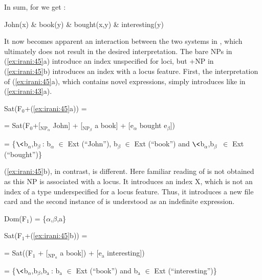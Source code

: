 \documentclass[output=paper,
modfonts
]{langscibook}
\begin{document}
In sum, for  we get :

\begin{exe}

\ex\label{ex:irani:62} John(x) \& book(y) \& bought(x,y) \& interesting(y)

\end{exe}

It now becomes apparent an interaction between the two systems in , which ultimately does not result in the desired interpretation. The bare NPs in (\ref{ex:irani:45}a) introduce an index unspecified for loci, but +NP in (\ref{ex:irani:45}b) introduces an index with a locus feature. First, the interpretation of (\ref{ex:irani:45}a), which contains novel expressions, simply introduces  like in (\ref{ex:irani:43}a). 

\begin{exe}

\ex Sat(F$_0$+(\ref{ex:irani:45}a)) = \par 
= Sat(F$_0$+[$_{\text{NP}_{\alpha}}$ John] + [$_{\text{NP}_\beta}$ a book] + [e$_{\alpha}$ bought e$_{\beta}$])\par 
= \{$\<$b$_{\alpha}$,b$_{\beta}\>$: b$_{\alpha}$ \(\in\) Ext (``John''), b$_{\beta}$ \(\in\) Ext (``book'') and $\<$b$_{\alpha}$,b$_{\beta}\>$ \(\in\) Ext \\ (``bought'')\}  

\end{exe}

(\ref{ex:irani:45}b), in contrast, is different. Here familiar reading of  is not obtained as this NP is associated with a locus. It introduces an index X, which is not an index of a type underspecified for a locus feature. Thus, it introduces a new file card and the second instance of  is understood as an indefinite expression. 

\begin{exe}

\ex Dom(F$_1$) = \{\(\alpha\),\(\beta\),a\}\par 

Sat(F$_1$+(\ref{ex:irani:45}b)) = \par 
= Sat((F$_1$ + [$_{\text{NP}_{a}}$ a book]) + [e$_\text{a}$ interesting]) \par 
= \{$\<$b$_{\alpha}$,b$_{\beta}$,b$_\text{a}\>$: b$_\text{a}$ \(\in\) Ext (``book'') and b$_\text{a}$ \(\in\) Ext (``interesting'')\} \par 

\end{exe}
\end{document}
